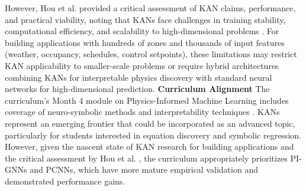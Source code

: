 \documentclass[12pt,a4paper]{article}
\begin{document}
However, Hou et al. provided a critical assessment of KAN claims, performance, and practical viability, noting that KANs face challenges in training stability, computational efficiency, and scalability to high-dimensional problems \cite{ref347}. For building applications with hundreds of zones and thousands of input features (weather, occupancy, schedules, control setpoints), these limitations may restrict KAN applicability to smaller-scale problems or require hybrid architectures combining KANs for interpretable physics discovery with standard neural networks for high-dimensional prediction.
\textbf{Curriculum Alignment}
The curriculum's Month 4 module on Physics-Informed Machine Learning includes coverage of neuro-symbolic methods and interpretability techniques \cite{ref170}. KANs represent an emerging frontier that could be incorporated as an advanced topic, particularly for students interested in equation discovery and symbolic regression. However, given the nascent state of KAN research for building applications and the critical assessment by Hou et al. \cite{ref347}, the curriculum appropriately prioritizes PI-GNNs and PCNNs, which have more mature empirical validation and demonstrated performance gains.
\end{document}
